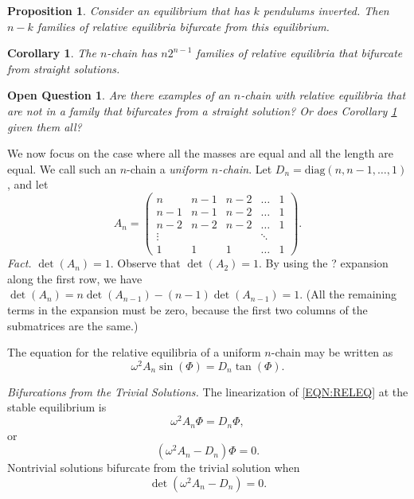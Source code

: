 \documentclass[11pt]{amsart}
\newtheorem{prop}{Proposition}
\newtheorem{corr}{Corollary}
\newtheorem{open}{Open Question}
\begin{document}
\begin{prop}
Consider an equilibrium that has $k$ pendulums inverted.
Then $n-k$ families of relative equilibria bifurcate from this
equilibrium.
\end{prop}

\begin{corr}
The $n$-chain has $n2^{n-1}$ families of relative equilibria that
bifurcate from straight solutions.
\label{COR:COUNT}
\end{corr}

\begin{open}
Are there examples of an $n$-chain with relative equilibria that are not
in a family that bifurcates from a straight solution?
Or does Corollary \ref{COR:COUNT} given them all?
\end{open}

We now focus on the case where all the masses are equal and all the length are equal.
We call such an $n$-chain a \emph{uniform $n$-chain}.
Let $D_n = \textrm{diag}(n,n-1,\ldots,1)$, and let
\[
   A_n = \begin{pmatrix}
            n &   n-1 & n-2  &\ldots & 1 \\
            n-1 & n-1 & n-2  & \ldots & 1 \\
            n-2 & n-2 & n-2  & \ldots & 1 \\
            \vdots & & & \ddots &  \\
            1 & 1 & 1 & \ldots & 1
          \end{pmatrix}.
\]
\emph{Fact.} $\det(A_n)=1$. Observe that $\det(A_2)=1$.  By using the ? expansion
along the first row, we have $\det(A_n) = n\det(A_{n-1}) -(n-1)\det(A_{n-1}) = 1$.
(All the remaining terms in the expansion must be zero, because the first two
columns of the submatrices are the same.)

The equation for the relative equilibria of a uniform $n$-chain may be written as
\begin{equation}
    \omega^2 A_n \sin(\Phi) = D_n\tan(\Phi).
    \label{EQN:RELEQ}
\end{equation}


\noindent
\emph{Bifurcations from the Trivial Solutions.}
The linearization of \eqref{EQN:RELEQ} at the stable equilibrium is
\[
   \omega^2 A_n \Phi = D_n \Phi,
\]
or
\[
   \left(\omega^2A_n - D_n\right)\Phi = 0.
\]
Nontrivial solutions bifurcate from the trivial solution when
\[
  \det\left(\omega^2A_n - D_n\right) = 0.
\]
\end{document}

